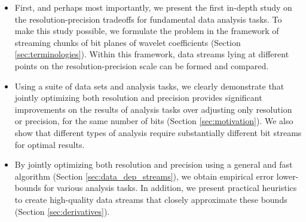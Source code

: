 \begin{itemize}
\item First, and perhaps most importantly, we present the first in-depth study on the
  resolution-precision tradeoffs for fundamental data analysis tasks. To make this study possible,
  we formulate the problem in the framework of streaming chunks of bit planes of wavelet
  coefficients (Section \ref{sec:terminologies}). Within this framework, data streams lying at
  different points on the resolution-precision scale can be formed and compared.
   
\item Using a suite of data sets and analysis tasks, we clearly demonstrate that jointly optimizing
  both resolution and precision provides significant improvements on the results of analysis tasks
  over adjusting only resolution or precision, for the same number of bits (Section
  \ref{sec:motivation}). We also show that different types of analysis require substantially
  different bit streams for optimal results.

\item By jointly optimizing both resolution and precision using a general and fast algorithm
  (Section \ref{sec:data_dep_streams}), we obtain empirical error lower-bounds for various analysis
  tasks. In addition, we present practical heuristics to create high-quality data streams that
  closely approximate these bounds (Section \ref{sec:derivatives}).
\end{itemize}

